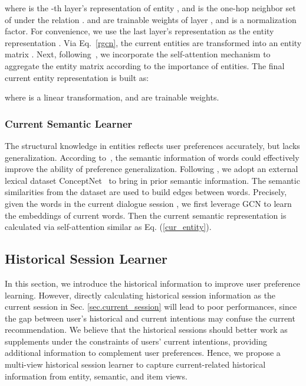 \documentclass[sigconf,natbib=true]{acmart}
\begin{document}
where  is the -th layer's representation of entity , and  is the one-hop neighbor set of  under the relation .  and  are trainable weights of layer , and  is a normalization factor. For convenience, we use the last layer's representation  as the entity representation . Via Eq.~\ref{rgcn}, the current entities  are transformed into an entity matrix .
Next, following~\cite{chen2019towards,zhou2020improving}, we incorporate the self-attention mechanism to aggregate the entity matrix  according to the importance of entities. The final current entity representation  is built as:

where  is a linear transformation,  and  are trainable weights.


\subsubsection{Current Semantic Learner}
\label{cur_word_learner}

The structural knowledge in entities reflects user preferences accurately, but lacks generalization. According to~\cite{zhou2020improving}, the semantic information of words could effectively improve the ability of preference generalization.
Following \cite{zhou2020improving}, we adopt an external lexical dataset ConceptNet~\cite{speer2017conceptnet} to bring in prior semantic information. The semantic similarities from the dataset are used to build edges between words.
Precisely, given the words in the current dialogue session , we first leverage GCN to learn the embeddings of current words. Then the current semantic representation  is calculated via self-attention similar as Eq. (\ref{cur_entity}).


\subsection{Historical Session Learner}
\label{his_sess_learner}


In this section, we introduce the historical information to improve user preference learning. However, directly calculating historical session information as the current session in Sec. \ref{sec.current_session} will lead to poor performances, since the gap between user's historical and current intentions may confuse the current recommendation. We believe that the historical sessions should better work as supplements under the constraints of users' current intentions, providing additional information to complement user preferences.
Hence, we propose a multi-view historical session learner to capture current-related historical information from entity, semantic, and item views.
\end{document}
